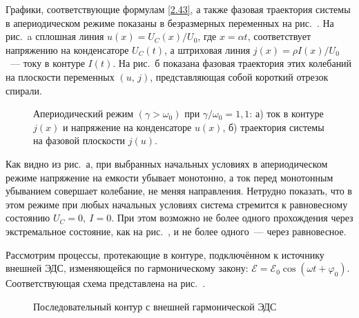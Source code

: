 Графики, соответствующие формулам \eqref{2.43}, а также фазовая траектория
системы в апериодическом режиме показаны в безразмерных переменных на
рис.~. На рис.~a сплошная линия
$u(x)=U_C(x)/U_0$, где $x=\alpha t$, соответствует напряжению на конденсаторе
$U_C(t)$, а штриховая линия $j(x)=\rho I(x)/U_0$~--- току в контуре $I(t)$.
На рис.~б показана фазовая траектория этих колебаний на плоскости
переменных $(u,\,j)$, представляющая собой
короткий отрезок спирали.

\begin{figure}[h]
	\begin{minipage}[h]{0.49\linewidth}
		\centering
	\end{minipage}
	\hfill
	\begin{minipage}[h]{0.49\linewidth}
		\centering
	\end{minipage}
	\caption{Апериодический режим $(\gamma>\omega_0)$ при
$\gamma/\omega_0=1,1$: а) ток в контуре $j(x)$ и напряжение на конденсаторе $u(x)$,
б) траектория системы на фазовой плоскости $j(u)$.}
\end{figure}

Как видно из рис.~а, 
при выбранных начальных условиях в апериодическом режиме напряжение на емкости 
убывает монотонно, а ток перед монотонным убыванием
совершает колебание, не меняя направления. Нетрудно показать, что в этом режиме при
любых начальных условиях система стремится к равновесному состоянию
$U_C=0,~I=0$. При этом возможно не более одного прохождения через экстремальное
состояние, как на рис.~, и не более одного~--- через равновесное.

\label{sec:forced}

\label{sec:complex}

Рассмотрим процессы, протекающие в контуре, подключённом к источнику внешней
ЭДС, изменяющейся по гармоническому закону:
$\mathcal{E}=\mathcal{E}_0\cos(\omega t+\varphi_0)$. Соответствующая схема
представлена на рис.~.

\begin{wrapfigure}{o}{0.3\textwidth}
	\centering
	\caption{Последовательный контур с внешней гармонической ЭДС}
\end{wrapfigure}

